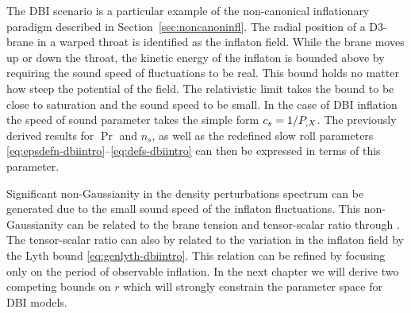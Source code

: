 The DBI scenario 
is a particular example of the non-canonical inflationary paradigm described in
Section~\ref{sec:noncanoninfl}. 
The radial position of a D3-brane in a warped throat is identified as the inflaton field. While the
brane moves up or down the throat, the kinetic energy of the inflaton is bounded above by requiring
the sound speed of fluctuations to be real. This bound holds no matter how steep the potential of
the field. The relativistic limit takes the bound to be close to saturation and the sound speed to
be small.
% 
In the case of DBI inflation the speed of sound
parameter
takes the simple form $c_s = 1/P_{,X}$. The previously derived
results for $\Pr$ and $n_s$, as well as the redefined slow roll parameters 
\eqref{eq:epsdefn-dbiintro}--\eqref{eq:defs-dbiintro} can then be expressed in terms
of this parameter. 

Significant non-Gaussianity in the density perturbations spectrum can be generated
due to the small sound speed of the inflaton fluctuations.
This non-Gaussianity can be related to the brane tension and tensor-scalar ratio
through . The tensor-scalar ratio can also by related to the variation in
the inflaton field by the Lyth bound \eqref{eq:genlyth-dbiintro}. This relation can be refined by
focusing only on the period of observable inflation. 
% 
In the next chapter we will derive two
competing bounds on $r$ which will strongly constrain the parameter space for
DBI models.


